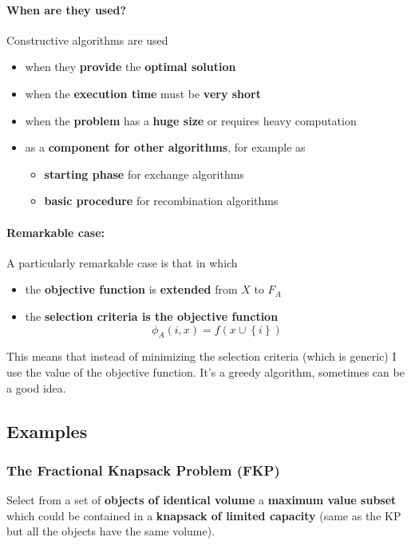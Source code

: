 \documentclass[11pt]{article}
\begin{document}
	\paragraph{When are they used?} Constructive algorithms are used
	\begin{itemize}
		\item when they \textbf{provide} the \textbf{optimal solution}
		\item when the \textbf{execution time} must be \textbf{very short} 
		\item when the \textbf{problem} has a \textbf{huge size} or requires heavy computation 
		\item as a \textbf{component for other algorithms}, for example as
		\begin{itemize}
			\item \textbf{starting phase} for exchange algorithms 
			\item \textbf{basic procedure} for recombination algorithms
		\end{itemize}
	\end{itemize}
	
	\paragraph{Remarkable case:} A particularly remarkable case is that in which
	\begin{itemize}
		\item the \textbf{objective function} is \textbf{extended} from $X$ to $F_A$
		\item the \textbf{selection criteria is the objective function}
		$$ \phi_A (i,x) = f\left(x \cup \left\{i\right\}\right) $$
	\end{itemize}
	This means that instead of minimizing the selection criteria (which is generic) I use the value of the objective function. It's a greedy algorithm, sometimes can be a good idea.\\
	
	\newpage
	
	\subsection{Examples}
	\subsubsection{The Fractional Knapsack Problem (FKP)}
	Select from a set of \textbf{objects of identical volume} a \textbf{maximum value subset} which could be contained in a \textbf{knapsack of limited capacity} (same as the KP but all the objects have the same volume).\\
	
\end{document}
